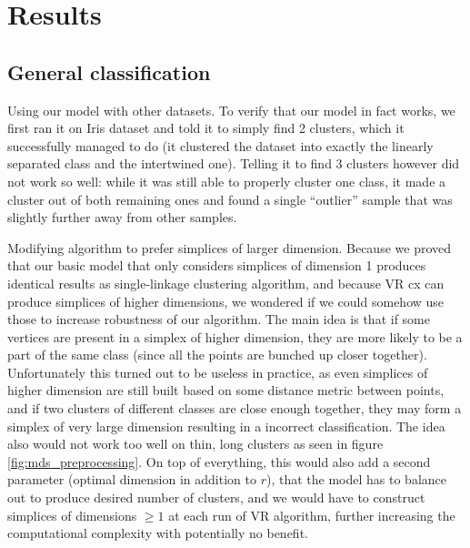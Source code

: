 \documentclass{article}
\newcommand{\enterProblemHeader}[1]{
}
\newcommand{\exitProblemHeader}[1]{
}
\newcounter{homeworkProblemCounter} %
\newcommand{\homeworkProblemName}{}
\newenvironment{homeworkProblem}[1][Problem \arabic{homeworkProblemCounter}]{ %
\stepcounter{homeworkProblemCounter} %
\renewcommand{\homeworkProblemName}{#1} %
\section{\homeworkProblemName} %
\enterProblemHeader{\homeworkProblemName} %
}{
\exitProblemHeader{\homeworkProblemName} %
}
\newcommand{\homeworkSectionName}{}
\newenvironment{homeworkSection}[1]{ %
\renewcommand{\homeworkSectionName}{#1} %
\subsection{\homeworkSectionName} %
\enterProblemHeader{\homeworkProblemName\ [\homeworkSectionName]} %
}{
\enterProblemHeader{\homeworkProblemName} %
}
\begin{document}
\begin{homeworkProblem}[Results]
\begin{homeworkSection}{General classification}
\begin{paragraph}{Using our model with other datasets.}
  To verify that our model in fact works, we first ran it on Iris dataset and told it to simply find 2 clusters, which it successfully managed to do (it clustered the dataset into exactly the linearly separated class and the intertwined one). Telling it to find 3 clusters however did not work so well: while it was still able to properly cluster one class, it made a cluster out of both remaining ones and found a single ``outlier'' sample that was slightly further away from other samples.
\end{paragraph}

\begin{paragraph}{Modifying algorithm to prefer simplices of larger dimension.}  
  Because we proved that our basic model that only considers simplices of dimension 1 produces identical results as single-linkage clustering algorithm, and because VR cx can produce simplices of higher dimensions, we wondered if we could somehow use those to increase robustness of our algorithm. The main idea is that if some vertices are present in a simplex of higher dimension, they are more likely to be a part of the same class (since all the points are bunched up closer together). Unfortunately this turned out to be useless in practice, as even simplices of higher dimension are still built based on some distance metric between points, and if two clusters of different classes are close enough together, they may form a simplex of very large dimension resulting in a incorrect classification. The idea also would not work too well on thin, long clusters as seen in figure \ref{fig:mds_preprocessing}. On top of everything, this would also add a second parameter (optimal dimension in addition to $r$), that the model has to balance out to produce desired number of clusters, and we would have to construct simplices of dimensions $\ge 1$ at each run of VR algorithm, further increasing the computational complexity with potentially no benefit.
\end{paragraph}

\end{homeworkSection}
\end{homeworkProblem}
\end{document}
